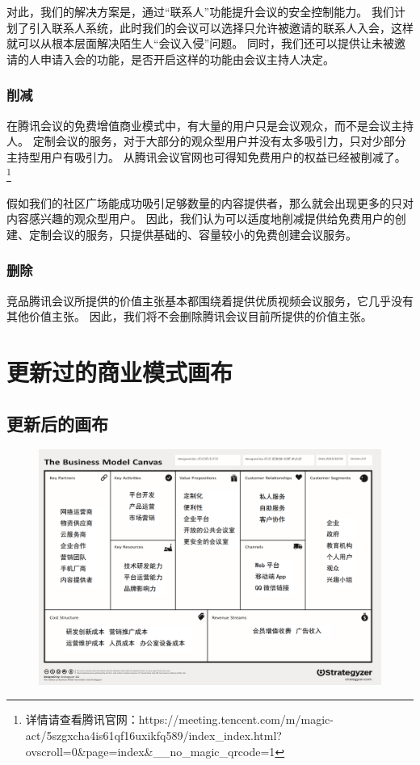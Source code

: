 \documentclass[a4paper,12pt]{article}
\begin{document}
    对此，我们的解决方案是，通过“联系人”功能提升会议的安全控制能力。
    我们计划了引入联系人系统，此时我们的会议可以选择只允许被邀请的联系人入会，这样就可以从根本层面解决陌生人“会议入侵”问题。
    同时，我们还可以提供让未被邀请的人申请入会的功能，是否开启这样的功能由会议主持人决定。


    \subsubsection{削减}
    在腾讯会议的免费增值商业模式中，有大量的用户只是会议观众，而不是会议主持人。
    定制会议的服务，对于大部分的观众型用户并没有太多吸引力，只对少部分主持型用户有吸引力。
    从腾讯会议官网也可得知免费用户的权益已经被削减了。
    \footnote{详情请查看腾讯官网：https://meeting.tencent.com/m/magic-act/5szgxcha4is61qf16uxikfq589/index\_index.html?ovscroll=0\&page=index\&\_\_no\_magic\_qrcode=1}

    假如我们的社区广场能成功吸引足够数量的内容提供者，那么就会出现更多的只对内容感兴趣的观众型用户。
    因此，我们认为可以适度地削减提供给免费用户的创建、定制会议的服务，只提供基础的、容量较小的免费创建会议服务。


    \subsubsection{删除}

    竞品腾讯会议所提供的价值主张基本都围绕着提供优质视频会议服务，它几乎没有其他价值主张。
    因此，我们将不会删除腾讯会议目前所提供的价值主张。


    


\section{更新过的商业模式画布}
    \subsection{更新后的画布}
    \clearpage
    \begin{figure}[htbp]
        \centering
        \includegraphics[scale=0.3]{png/更新画布}
        \caption{}
        \label{fig:update}
    \end{figure}
\end{document}
